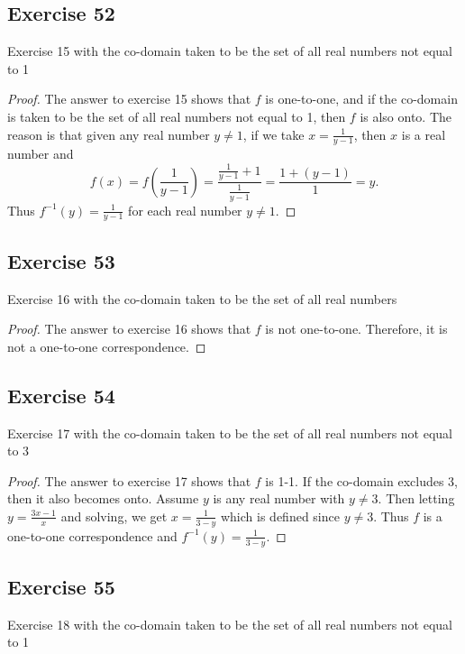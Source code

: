 \documentclass[14pt]{extarticle}
\begin{document}
\subsection{Exercise 52}
Exercise 15 with the co-domain taken to be the set of all real numbers not equal to 1

\begin{proof}
    The answer to exercise 15 shows that $f$ is one-to-one, and if the co-domain is taken to be the set of all real numbers
    not equal to 1, then $f$ is also onto. The reason is that given any real number \(y \neq 1\), if we take
    \(x = \frac{1}{y-1}\), then $x$ is a real number and
    \[
        f(x) = f\left(\frac{1}{y-1}\right) = \frac{\frac{1}{y-1} + 1}{\frac{1}{y-1}} = \frac{1+(y-1)}{1} = y.
    \]
    Thus \(f^{-1}(y) = \frac{1}{y-1}\) for each real number \(y \neq 1\).
\end{proof}

\subsection{Exercise 53}
Exercise 16 with the co-domain taken to be the set of all real numbers

\begin{proof}
    The answer to exercise 16 shows that $f$ is not one-to-one. Therefore, it is not a one-to-one correspondence.
\end{proof}

\subsection{Exercise 54}
Exercise 17 with the co-domain taken to be the set of all real numbers not equal to 3

\begin{proof}
    The answer to exercise 17 shows that $f$ is 1-1. If the co-domain excludes 3, then it also becomes onto. Assume $y$ is
    any real number with \(y \neq 3\). Then letting \(y = \frac{3x-1}{x}\) and solving, we get \(x = \frac{1}{3-y}\)
    which is defined since \(y \neq 3\). Thus $f$ is a one-to-one correspondence and \(f^{-1}(y) = \frac{1}{3-y}\).
\end{proof}

\subsection{Exercise 55}
Exercise 18 with the co-domain taken to be the set of all real numbers not equal to 1
\end{document}
